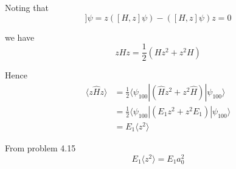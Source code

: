 


\bigskip
Noting that
\begin{equation*}
[z,[H,z]]\psi=z([H,z]\psi)-([H,z]\psi)z=0
\end{equation*}

we have
\begin{equation*}
zHz=\frac{1}{2}(Hz^2+z^2H)
\end{equation*}

Hence
\begin{align*}
\langle z\hat Hz\rangle&=\frac{1}{2}\langle\psi_{100}|(\hat Hz^2+z^2\hat H)|\psi_{100}\rangle
\\
&=\frac{1}{2}\langle\psi_{100}|(E_1z^2+z^2E_1)|\psi_{100}\rangle
\\
&=E_1\langle z^2\rangle
\end{align*}

From problem 4.15
\begin{equation*}
E_1\langle z^2\rangle=E_1a_0^2\tag{1}
\end{equation*}


